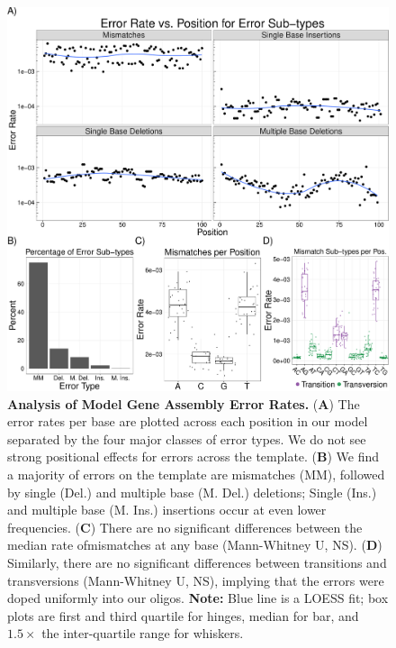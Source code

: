 \documentclass[twocolumn]{article}
\begin{document}
\clearpage
\begin{figure}[!ht]
\begin{center}
\includegraphics[width=170mm]{Figure_2-1.pdf}
\end{center}
\caption{\small \textbf{Analysis of Model Gene Assembly Error Rates.} (\textbf{A}) The error rates per base are plotted across each position in our model separated  by the four major classes of error types. We do not see strong positional effects for errors across the template. (\textbf{B}) We find a majority of errors on the template are mismatches (MM), followed by single (Del.) and multiple base (M. Del.) deletions; Single (Ins.) and multiple base (M. Ins.) insertions occur at even lower frequencies. (\textbf{C}) There are no significant differences between the median rate ofmismatches at any base (Mann-Whitney U, NS). (\textbf{D}) Similarly, there are no significant differences between transitions and transversions (Mann-Whitney U, NS), implying that the errors were doped uniformly into our oligos. \textbf{Note:} Blue line is a LOESS fit; box plots are first and third quartile for hinges, median for bar, and $1.5\times$ the inter-quartile range for whiskers.}
\label{fig:nonDoped}
\end{figure}

\end{document}
